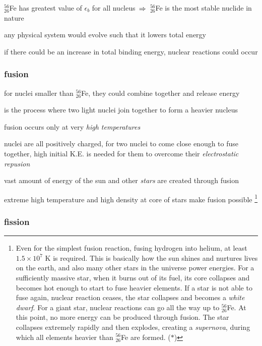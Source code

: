 \cmt $^{56}_{26}$Fe has greatest value of $\epsilon_b$ for all nucleus $\, \Rightarrow \,$ $^{56}_{26}$Fe is the most stable nuclide in nature

\cmt any physical system would evolve such that it lowers total energy

if there could be an increase in total binding energy, nuclear reactions could occur


\subsubsection{fusion}

for nuclei smaller than $^{56}_{26}$Fe, they could combine together and release energy

\begin{ilight}
	 is the process where two light nuclei join together to form a heavier nucleus
\end{ilight}

\cmt fusion occurs only at very \emph{high temperatures}

nuclei are all positively charged, for two nuclei to come close enough to fuse together, high initial K.E. is needed for them to overcome their \emph{electrostatic repusion}

\cmt vast amount of energy of the sun and other \emph{stars} are created through fusion

extreme high temperature and high density at core of stars make fusion possible
\footnote{Even for the simplest fusion reaction, fusing hydrogen into helium, at least $1.5\times 10^7 \text{ K}$ is required. This is basically how the sun shines and nurtures lives on the earth, and also many other stars in the universe power energies. For a sufficiently massive star, when it burns out of its fuel, its core collapses and becomes hot enough to start to fuse heavier elements. If a star is not able to fuse again, nuclear reaction ceases, the star collapses and becomes a \emph{white dwarf}. For a giant star, nuclear reactions can go all the way up to $^{56}_{26}$Fe. At this point, no more energy can be produced through fusion. The star collapses extremely rapidly and then explodes, creating a \emph{supernova}, during which all elements heavier than $^{56}_{26}$Fe are formed. ($\ast$)}


\subsubsection{fission}

